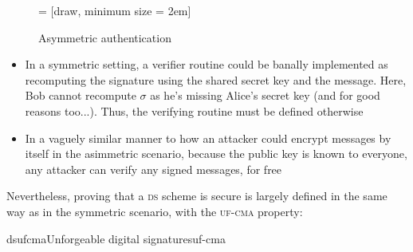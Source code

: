 \begin{figure}
    \centering

     = [draw, minimum size = 2em]

    \caption{Asymmetric authentication}
    \label{fig:digisign}
\end{figure}

\begin{itemize}
    \item In a symmetric setting, a verifier routine could be banally implemented as recomputing the signature using the shared secret key and the message. Here, Bob cannot recompute $\sigma$ as he's missing Alice's secret key (and for good reasons too...). Thus, the verifying routine must be defined otherwise
    \item In a vaguely similar manner to how an attacker could encrypt messages by itself in the asimmetric scenario, because the public key is known to everyone, any attacker can verify any signed messages, for free
\end{itemize}

Nevertheless, proving that a \textsc{ds} scheme is secure is largely defined in the same way as in the symmetric scenario, with the \textsc{uf-cma} property:

\begin{cryptogame}{dsufcma}{Unforgeable digital signatures}{uf-cma}
    

    \cseqdelay


    \cseqdelay


\end{cryptogame}


